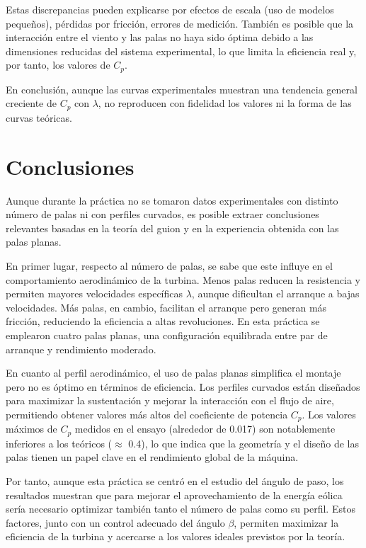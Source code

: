 \documentclass[10pt]{IEEEtran}
\begin{document}
Estas discrepancias pueden explicarse por efectos de escala (uso de modelos pequeños), pérdidas por fricción, errores de medición. También es posible que la interacción entre el viento y las palas no haya sido óptima debido a las dimensiones reducidas del sistema experimental, lo que limita la eficiencia real y, por tanto, los valores de $C_p$.

En conclusión, aunque las curvas experimentales muestran una tendencia general creciente de $C_p$ con $\lambda$, no reproducen con fidelidad los valores ni la forma de las curvas teóricas.

\section{Conclusiones}
Aunque durante la práctica no se tomaron datos experimentales con distinto número de palas ni con perfiles curvados, es posible extraer conclusiones relevantes basadas en la teoría del guion y en la experiencia obtenida con las palas planas.

En primer lugar, respecto al número de palas, se sabe que este influye en el comportamiento aerodinámico de la turbina. Menos palas reducen la resistencia y permiten mayores velocidades específicas $\lambda$, aunque dificultan el arranque a bajas velocidades. Más palas, en cambio, facilitan el arranque pero generan más fricción, reduciendo la eficiencia a altas revoluciones. En esta práctica se emplearon cuatro palas planas, una configuración equilibrada entre par de arranque y rendimiento moderado.

En cuanto al perfil aerodinámico, el uso de palas planas simplifica el montaje pero no es óptimo en términos de eficiencia. Los perfiles curvados están diseñados para maximizar la sustentación y mejorar la interacción con el flujo de aire, permitiendo obtener valores más altos del coeficiente de potencia $C_p$. Los valores máximos de $C_p$ medidos en el ensayo (alrededor de 0.017) son notablemente inferiores a los teóricos ($\approx$ 0.4), lo que indica que la geometría y el diseño de las palas tienen un papel clave en el rendimiento global de la máquina.

Por tanto, aunque esta práctica se centró en el estudio del ángulo de paso, los resultados muestran que para mejorar el aprovechamiento de la energía eólica sería necesario optimizar también tanto el número de palas como su perfil. Estos factores, junto con un control adecuado del ángulo $\beta$, permiten maximizar la eficiencia de la turbina y acercarse a los valores ideales previstos por la teoría.
\end{document}
